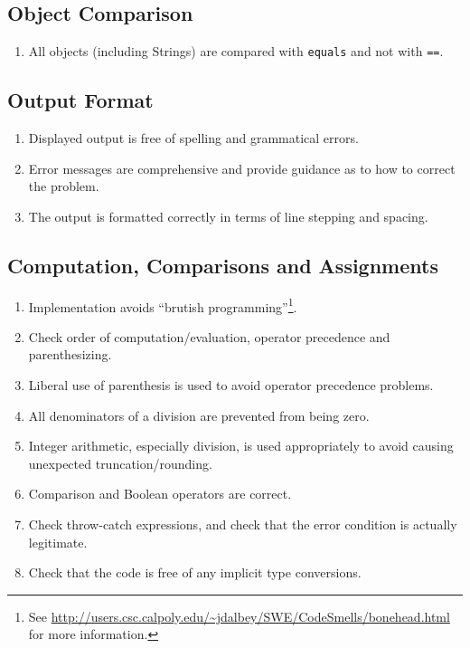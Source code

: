 \documentclass{article}
\begin{document}
\subsection*{Object Comparison}\begin{enumerate}[resume]
\item All objects (including Strings) are compared with \texttt{equals} and not with \texttt{==}.
\end{enumerate}

\subsection*{Output Format}\begin{enumerate}[resume]
\item Displayed output is free of spelling and grammatical errors.
\item Error messages are comprehensive and provide guidance as to how to correct the problem.
\item The output is formatted correctly in terms of line stepping and spacing.
\end{enumerate}

\subsection*{Computation, Comparisons and Assignments}\begin{enumerate}[resume]
\item Implementation avoids “brutish programming”\footnote{See \url{http://users.csc.calpoly.edu/~jdalbey/SWE/CodeSmells/bonehead.html} for more information.}. 
\item Check order of computation/evaluation, operator precedence and parenthesizing.
\item Liberal use of parenthesis is used to avoid operator precedence problems.
\item All denominators of a division are prevented from being zero.
\item Integer arithmetic, especially division, is used appropriately to avoid causing unexpected truncation/rounding.
\item Comparison and Boolean operators are correct.
\item Check throw-catch expressions, and check that the error condition is actually legitimate.
\item Check that the code is free of any implicit type conversions.
\end{enumerate}
\end{document}
